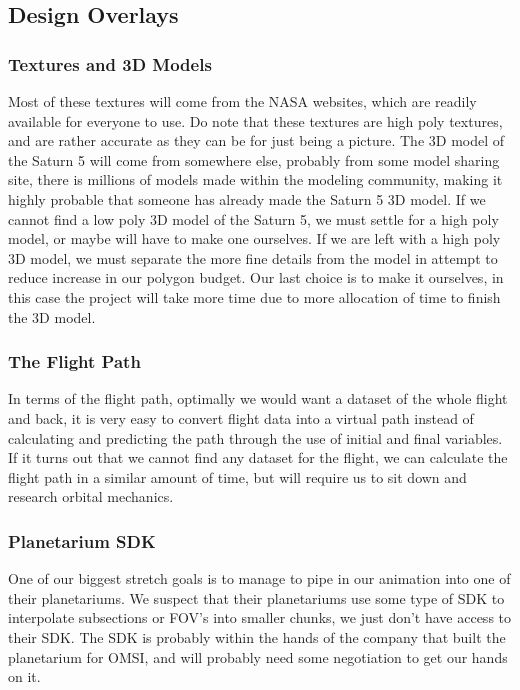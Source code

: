 \documentclass[onecolumn, draftclsnofoot,10pt, compsoc]{IEEEtran}
\begin{document}
    \subsection{Design Overlays} %
	
	\subsubsection{Textures and 3D Models}
	Most of these textures will come from the NASA websites, which are readily available for everyone to use. Do note that these textures are high poly textures, and are rather accurate as they can be for just being a picture. The 3D model of the Saturn 5 will come from somewhere else, probably from some model sharing site, there is millions of models made within the modeling community, making it highly probable that someone has already made the Saturn 5 3D model. If we cannot find a low poly 3D model of the Saturn 5, we must settle for a high poly model, or maybe will have to make one ourselves. If we are left with a high poly 3D model, we must separate the more fine details from the model in attempt to reduce increase in our polygon budget. Our last choice is to make it ourselves, in this case the project will take more time due to more allocation of time to finish the 3D model.
	
	\subsubsection{The Flight Path}
	In terms of the flight path, optimally we would want a dataset of the whole flight and back, it is very easy to convert flight data into a virtual path instead of calculating and predicting the path through the use of initial and final variables. If it turns out that we cannot find any dataset for the flight, we can calculate the flight path in a similar amount of time, but will require us to sit down and research orbital mechanics. 
	
	\subsubsection{Planetarium SDK}
	One of our biggest stretch goals is to manage to pipe in our animation into one of their planetariums. We suspect that their planetariums use some type of SDK to interpolate subsections or FOV's into smaller chunks, we just don't have access to their SDK. The SDK is probably within the hands of the company that built the planetarium for OMSI, and will probably need some negotiation to get our hands on it. 
    
\end{document}
